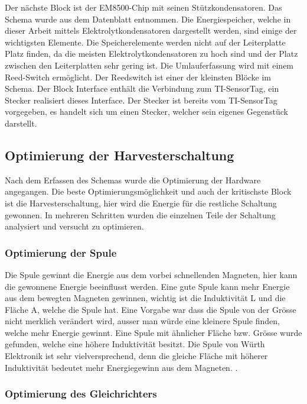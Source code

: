 Der nächste Block ist der EM8500-Chip mit seinen Stützkondensatoren. Das Schema wurde aus dem Datenblatt entnommen. 
Die Energiespeicher, welche in dieser Arbeit mittels Elektrolytkondensatoren dargestellt werden, sind einige der wichtigsten Elemente. Die Speicherelemente werden nicht auf der Leiterplatte Platz finden, da die meisten Elektrolytkondensatoren zu hoch sind und der Platz zwischen den Leiterplatten sehr gering ist. 
Die Umlauferfassung wird mit einem Reed-Switch ermöglicht. Der Reedswitch ist einer der kleinsten Blöcke im Schema.
Der Block Interface enthält die Verbindung zum TI-SensorTag, ein Stecker realisiert dieses Interface. Der Stecker ist bereits vom TI-SensorTag vorgegeben, es handelt sich um einen Stecker, welcher sein eigenes Gegenstück darstellt. 

\subsection{Optimierung der Harvesterschaltung}


Nach dem Erfassen des Schemas wurde die Optimierung der Hardware angegangen. Die beste Optimierungsmöglichkeit und auch der kritischste Block ist die Harvesterschaltung, hier wird die Energie für die restliche Schaltung gewonnen. In mehreren Schritten wurden die einzelnen Teile der Schaltung analysiert und versucht zu optimieren.

\subsubsection{Optimierung der Spule}

Die Spule gewinnt die Energie aus dem vorbei schnellenden Magneten, hier kann die gewonnene Energie beeinflusst werden. Eine gute Spule kann mehr Energie aus dem bewegten Magneten gewinnen, wichtig ist die Induktivität L und die Fläche A, welche die Spule hat. Eine Vorgabe war dass die Spule von der Grösse nicht merklich verändert wird, ausser man würde eine kleinere Spule finden, welche mehr Energie gewinnt. Eine Spule mit ähnlicher Fläche bzw. Grösse wurde gefunden, welche eine höhere Induktivität besitzt. Die Spule von Würth Elektronik ist sehr vielversprechend, denn die gleiche Fläche mit höherer Induktivität bedeutet mehr Energiegewinn aus dem Magneten.
.

\subsubsection{Optimierung des Gleichrichters}


